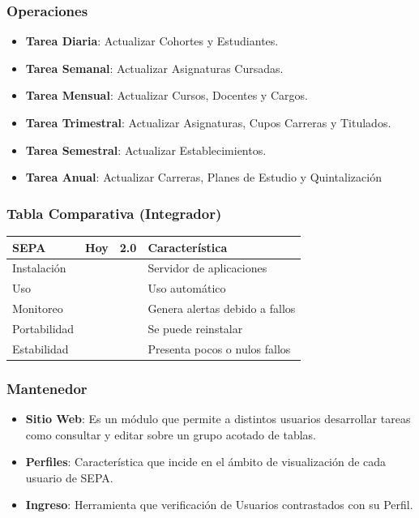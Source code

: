 \documentclass{beamer}
\newcommand{\cmark}{\ding{51}}%
\newcommand{\xmark}{\ding{55}}%
\begin{document}

\begin{frame}
\frametitle{Operaciones}
\begin{itemize}
\item \textbf{Tarea Diaria}: Actualizar Cohortes y Estudiantes.
\item \textbf{Tarea Semanal}: Actualizar Asignaturas Cursadas.
\item \textbf{Tarea Mensual}: Actualizar Cursos, Docentes y Cargos.
\item \textbf{Tarea Trimestral}: Actualizar Asignaturas, Cupos Carreras y Titulados.
\item \textbf{Tarea Semestral}: Actualizar Establecimientos.
\item \textbf{Tarea Anual}: Actualizar Carreras, Planes de Estudio y Quintalización
\end{itemize}
\end{frame}


\begin{frame}
\frametitle{Tabla Comparativa (Integrador)}
\begin{table}
\begin{tabular}{l l l l}
\toprule
\textbf{SEPA} & \textbf{Hoy} & \textbf{2.0} & Característica\\
\midrule
Instalación 	& \textcolor{green}{\cmark} & \textcolor{green}{\cmark} & Servidor de aplicaciones  \\
Uso		 		& \textcolor{green}{\cmark} & \textcolor{green}{\cmark} & Uso automático \\
Monitoreo 		& \textcolor{red}{\xmark}   & \textcolor{green}{\cmark} & Genera alertas debido a fallos \\
Portabilidad 	& \textcolor{red}{\xmark}   & \textcolor{green}{\cmark} & Se puede reinstalar \\
Estabilidad 	& \textcolor{red}{\xmark}   & \textcolor{green}{\cmark} & Presenta pocos o nulos fallos \\
\bottomrule
\end{tabular}
\end{table}
\end{frame}


\begin{frame}
\frametitle{Mantenedor}
\begin{itemize}
\item \textbf{Sitio Web}: Es un módulo que permite a distintos usuarios desarrollar tareas como consultar y editar sobre un grupo acotado de tablas.
\item \textbf{Perfiles}: Característica que incide en el ámbito de visualización de cada usuario de SEPA.
\item \textbf{Ingreso}: Herramienta que verificación de Usuarios contrastados con su Perfil.
\end{itemize}
\end{frame}
\end{document}
